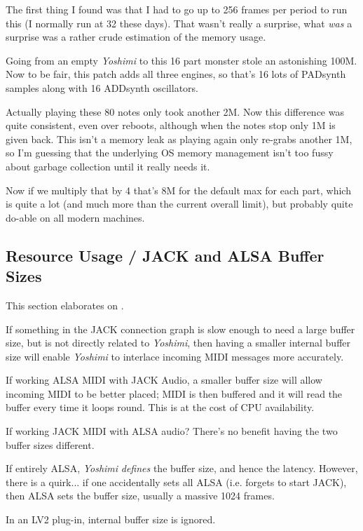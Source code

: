    The first thing I found was that I had to go up to 256 frames per period to
   run this (I normally run at 32 these days). That wasn't really a surprise,
   what \textsl{was} a surprise was a rather crude estimation of the memory
   usage.

   Going from an empty \textsl{Yoshimi} to this 16 part monster stole an
   astonishing 100M. Now to be fair, this patch adds all three engines, so
   that's 16 lots of PADsynth samples along with 16 ADDsynth oscillators.

   Actually playing these 80 notes only took another 2M. Now this difference
   was quite consistent, even over reboots, although when the notes stop only
   1M is given back. This isn't a memory leak as playing again only re-grabs
   another 1M, so I'm guessing that the underlying OS memory management isn't
   too fussy about garbage collection until it really needs it.

   Now if we multiply that by 4 that's 8M for the default max for each part,
   which is quite a lot (and much more than the current overall limit), but
   probably quite do-able on all modern machines.

\subsection{Resource Usage / JACK and ALSA Buffer Sizes}
\label{sec:resource_usage_buffer_sizes}

   This section elaborates on
   .

   If something in the JACK connection
   graph is slow enough to need a large buffer
   size, but is not directly related to \textsl{Yoshimi},
   then having a smaller internal
   buffer size will enable \textsl{Yoshimi}
   to interlace incoming MIDI messages more accurately.

   If working ALSA MIDI with JACK Audio, a smaller buffer size will allow
   incoming MIDI to be better placed; MIDI is then buffered and it will read
   the buffer every time it loops round. This is at the cost of CPU
   availability.

   If working JACK MIDI with ALSA audio? There's no benefit having the
   two buffer sizes different.

   If entirely ALSA, \textsl{Yoshimi} \textsl{defines}
   the buffer size, and hence the latency.
   However, there is a quirk... if one accidentally sets all ALSA
   (i.e. forgets to start JACK),
   then ALSA sets the buffer size, usually a massive 1024 frames.

   In an LV2 plug-in, internal buffer size is ignored.

